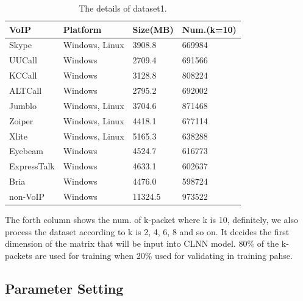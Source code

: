 \documentclass[conference]{IEEEtran}
\begin{document}
\begin{table}[htbp]
  \caption{The details of dataset1.}
  \label{tab:traffic}
  \centering
  \begin{tabular}{l l l l}
    \hline
    \textbf{VoIP} & \textbf{Platform} & \textbf{Size(MB)}& \textbf{Num.(k=10)}\\
    \hline
    Skype      & Windows, Linux  & 3908.8  &  669984  \\
    UUCall      & Windows  & 2709.4  &  691566  \\
    KCCall      & Windows  & 3128.8  &  808224  \\
    ALTCall      & Windows  & 2795.2  &  692002  \\
    Jumblo      & Windows, Linux  & 3704.6  &  871468  \\
    Zoiper      & Windows, Linux  & 4418.1  &  677114  \\
    Xlite      & Windows, Linux  & 5165.3  &  638288  \\
    Eyebeam      & Windows  & 4524.7  &  616773  \\
    ExpressTalk      & Windows  & 4633.1  &  602637  \\
    Bria      & Windows  & 4476.0  &  598724  \\
    non-VoIP      & Windows  & 11324.5  &  973522  \\
    \hline
  \end{tabular}
\end{table}

The forth column shows the num. of k-packet where k is 10, definitely, we also process the dataset according to k is 2, 4, 6, 8 and so on. It decides the first dimension of the matrix that will be input into CLNN model. 80\% of the k-packets are used for training when 20\% used for validating in training pahse.

\subsection{Parameter Setting}
\label{sec:params}
\end{document}
